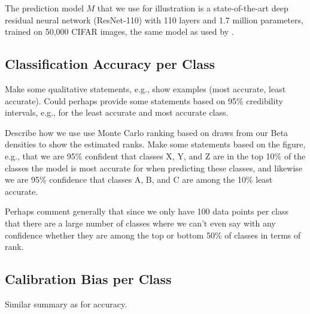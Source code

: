 \documentclass{article}
\begin{document}

The prediction model $M$ that we use for illustration is a state-of-the-art deep residual neural network   (ResNet-110) with 110 layers and 1.7 million parameters, trained on 50,000 CIFAR images, the same model as used by \cite{guo2017calibration}.


\subsection{Classification Accuracy per Class}

Make some qualitative statements, e.g., show examples (most accurate, least accurate). Could perhaps provide some statements based on 95\% credibility intervals, e.g., for the least accurate and most accurate class.

Describe how we use use Monte Carlo ranking \cite{marshall1998league} based on draws from our Beta densities  to show the estimated ranks. Make some statements based on the figure, e.g., that we are 95\% confident that classes X, Y, and Z are in the top 10\% of the classes the model is most accurate for when predicting these classes, and likewise we are 95\% confidence that classes A, B, and C are among the 10\% least accurate.

Perhaps comment generally that since we only have 100 data points per class that there are a large number of classes where we can't even say with any confidence whether they are among the top or bottom 50\% of classes in terms of rank.


\subsection{Calibration Bias per Class}

Similar summary as for accuracy.
\end{document}
